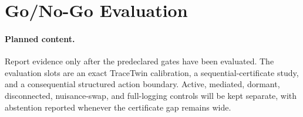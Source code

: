 \section{Go/No-Go Evaluation}
\label{sec:go-no-go-evaluation}

\paragraph{Planned content.}
Report evidence only after the predeclared gates have been evaluated. The
evaluation slots are an exact TraceTwin calibration, a sequential-certificate
study, and a consequential structured action boundary. Active, mediated,
dormant, disconnected, nuisance-swap, and full-logging controls will be kept
separate, with abstention reported whenever the certificate gap remains wide.

